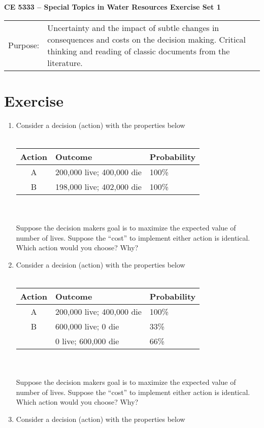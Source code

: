 \documentclass[12pt]{article}
\begin{document}
\begin{center}
{\textbf{{ CE 5333 -- Special Topics in Water Resources}  {Exercise Set 1}}}
\end{center}
\begingroup
\begin{tabular}{p{1in} p{5in}}
Purpose: & Uncertainty and the impact of subtle changes in consequences and costs on the decision making. Critical thinking and reading of classic documents from the literature. \\
\end{tabular}
\endgroup
\section*{\small{Exercise}}
\begin{enumerate}
\item Consider a decision (action) with the properties below \\ ~\\
\begin{tabular}{cll}
Action & Outcome & Probability \\
\hline
\hline
A & 200,000 live; 400,000 die & 100\% \\
B & 198,000 live; 402,000 die & 100\% \\
\end{tabular}\\~\\
Suppose the decision makers goal is to maximize the expected value of number of lives.
Suppose the ``cost'' to implement either action is identical.
Which action would you choose? Why?
\item Consider a decision (action) with the properties below \\ ~\\
\begin{tabular}{cll}
Action & Outcome & Probability \\
\hline
\hline
A & 200,000 live; 400,000 die & 100\% \\
B & 600,000 live; 0 die & 33\% \\
~ & 0 live; 600,000 die & 66\% \\
\end{tabular}\\~\\
Suppose the decision makers goal is to maximize the expected value of number of lives.
Suppose the ``cost'' to implement either action is identical.
Which action would you choose? Why?
\item Consider a decision (action) with the properties below \\ ~\\

\end{enumerate}
\end{document}
